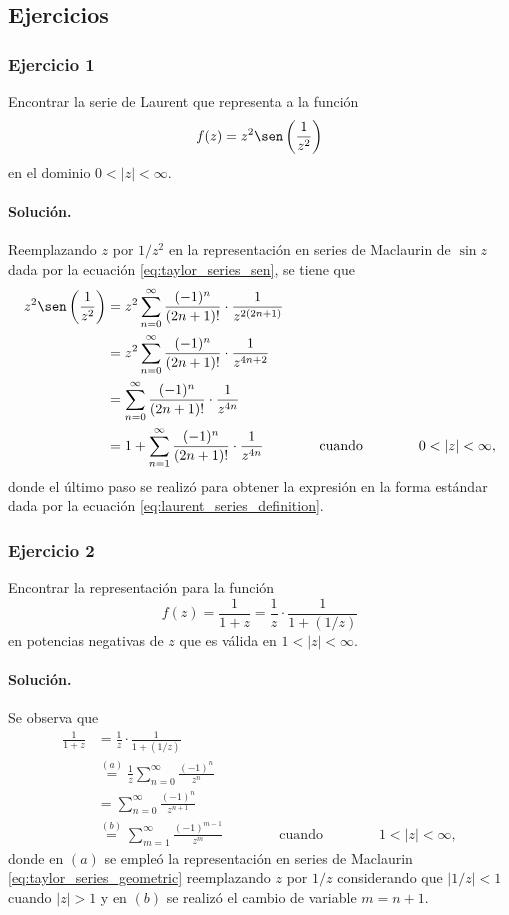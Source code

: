 \documentclass[a4paper]{report}
\begin{document}
\subsection*{Ejercicios}

\subsubsection*{Ejercicio 1}

Encontrar la serie de Laurent que representa a la función
\[
 f(z)=z^2\sen\left(\frac{1}{z^2}\right)
\]
en el dominio \(0<|z|<\infty\).

\paragraph{Solución.} Reemplazando \(z\) por \(1/z^2\) en la representación en series de Maclaurin de \(\sin z\) dada por la ecuación \ref{eq:taylor_series_sen}, se tiene que 
\begin{align*}
 z^2\sen\left(\frac{1}{z^2}\right)&=z^2\sum_{n=0}^\infty\frac{(-1)^n}{(2n+1)!}\cdot\frac{1}{z^{2(2n+1)}}\\ 
  &=z^2\sum_{n=0}^\infty\frac{(-1)^n}{(2n+1)!}\cdot\frac{1}{z^{4n+2}}\\
  &=\sum_{n=0}^\infty\frac{(-1)^n}{(2n+1)!}\cdot\frac{1}{z^{4n}}\\
  &=1+\sum_{n=1}^\infty\frac{(-1)^n}{(2n+1)!}\cdot\frac{1}{z^{4n}}
  \qquad\qquad\textrm{cuando}\qquad\qquad
  0<|z|<\infty,
\end{align*}
donde el último paso se realizó para obtener la expresión en la forma estándar dada por la ecuación \ref{eq:laurent_series_definition}.

\subsubsection*{Ejercicio 2}

Encontrar la representación para la función 
\[
 f(z)=\frac{1}{1+z}=\frac{1}{z}\cdot\frac{1}{1+(1/z)}
\]
en potencias negativas de \(z\) que es válida en \(1<|z|<\infty\).

\paragraph{Solución.} Se observa que
\begin{align*}
 \frac{1}{1+z}&=\frac{1}{z}\cdot\frac{1}{1+(1/z)}\\
   &\overset{(a)}{=}\frac{1}{z}\sum_{n=0}^\infty\frac{(-1)^n}{z^n}\\
   &=\sum_{n=0}^\infty\frac{(-1)^n}{z^{n+1}}\\
   &\overset{(b)}{=}\sum_{m=1}^\infty\frac{(-1)^{m-1}}{z^m}
   \qquad\qquad\textrm{cuando}\qquad\qquad
   1<|z|<\infty,
\end{align*}
donde en \((a)\) se empleó la representación en series de Maclaurin \ref{eq:taylor_series_geometric} reemplazando \(z\) por \(1/z\) considerando que \(|1/z|<1\) cuando \(|z|>1\) y en \((b)\) se realizó el cambio de variable \(m=n+1\).
\end{document}
